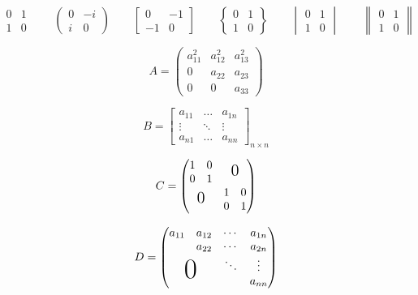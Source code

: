 \documentclass{ctexart}
\begin{document}
	\[
	\begin{matrix}
		0 & 1 \\
		1 & 0
	\end{matrix} \qquad
	\begin{pmatrix} 
		0 & -i \\
		i & 0
	\end{pmatrix} \qquad
	\begin{bmatrix} 
		0 & -1\\
		-1 & 0
	\end{bmatrix} \qquad
	\begin{Bmatrix}
		0 & 1\\
		1 & 0
	\end{Bmatrix} \qquad
	\begin{vmatrix}
		0 & 1\\
		1 & 0
	\end{vmatrix} \qquad
	\begin{Vmatrix}
		0 & 1\\
		1 & 0
	\end{Vmatrix} \qquad
	\]
	
	\[
	A = \begin{pmatrix}
		a_{11}^2 & a_{12}^2 & a_{13}^2\\
		0		 & a_{22}	& a_{23}\\
		0		 & 0		& a_{33}
	\end{pmatrix}
	\]
	
	\[
	B = \begin{bmatrix}
		a_{11} & \dots  & a_{1n}\\
		\vdots & \ddots	& \vdots\\
		a_{n1} & \dots	& a_{nn}
	\end{bmatrix}_{n \times n}
	\]
	
	\[
	C = \begin{pmatrix}
		\begin{matrix}1&0\\0&1\end{matrix} & \text{\Large 0}\\
		\text{\Large 0}					   & \begin{matrix}1&0\\0&1\end{matrix}
	\end{pmatrix}
	\]
	
	\[
	D = \begin{pmatrix}
		a_{11} & a_{12} & \cdots & a_{1n}\\
			   & a_{22} & \cdots & a_{2n}\\
			   & 		& \ddots & \vdots\\
		\multicolumn{2}{c}{\raisebox{1.3ex}[0pt]{\Huge 0}}
			   &		& a_{nn}
	\end{pmatrix}
	\]
	
\end{document}
